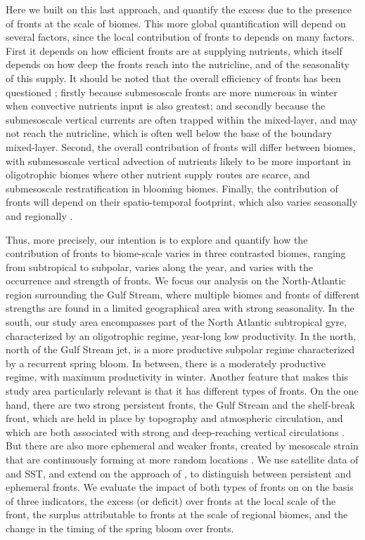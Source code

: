 Here we built on this last approach, and quantify the excess  due to the presence of fronts at the scale of biomes.
This more global quantification will depend on several factors, since the local contribution of fronts to  depends on many factors.
First it depends on how efficient fronts are at supplying nutrients, which itself depends on how deep the fronts reach into the nutricline, and of the seasonality of this supply.
It should be noted that the overall efficiency of fronts has been questioned \parencite{levy_2018}; firstly because submesoscale fronts are more numerous in winter when convective nutrients input is also greatest; and secondly because the submesoscale vertical currents are often trapped within the mixed-layer, and may not reach the nutricline, which is often well below the base of the boundary mixed-layer.
Second, the overall contribution of fronts will differ between biomes, with submesoscale vertical advection of nutrients likely to be more important in oligotrophic biomes where other nutrient supply routes are scarce, and submesoscale restratification in blooming biomes.
Finally, the contribution of fronts will depend on their spatio-temporal footprint, which also varies seasonally \parencite{callies_2015} and regionally \parencite{mauzole_2022}.

Thus, more precisely, our intention is to explore and quantify how the contribution of fronts to biome-scale  varies in three contrasted biomes, ranging from subtropical to subpolar, varies along the year, and varies with the occurrence and strength of fronts.
We focus our analysis on the North-Atlantic region surrounding the Gulf Stream, where multiple biomes and fronts of different strengths are found in a limited geographical area \parencite{bock_2022} with strong seasonality.
In the south, our study area encompasses part of the North Atlantic subtropical gyre, characterized by an oligotrophic regime, year-long low productivity.
In the north, north of the Gulf Stream jet, is a more productive subpolar regime characterized by a recurrent spring bloom.
In between, there is a moderately productive regime, with maximum productivity in winter.
Another feature that makes this study area particularly relevant is that it has different types of fronts.
On the one hand, there are two strong persistent fronts, the Gulf Stream and the shelf-break front, which are held in place by topography and atmospheric circulation, and which are both associated with strong and deep-reaching vertical circulations \parencite{flagg_2006, liao_2022}.
But there are also more ephemeral and weaker fronts, created by mesoscale strain that are continuously forming at more random locations \parencite{drushka_2019, sanchez-rios_2020}.
We use satellite data of  and SST, and extend on the approach of \textcite{liu_2016}, to distinguish between persistent and ephemeral fronts.
We evaluate the impact of both types of fronts on  on the basis of three indicators, the excess (or deficit)  over fronts at the local scale of the front, the surplus  attributable to fronts at the scale of regional biomes, and the change in the timing of the  spring bloom over fronts.


